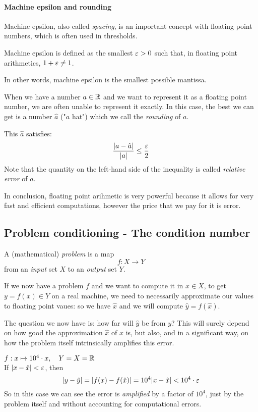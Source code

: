 \paragraph{Machine epsilon and rounding}
Machine epsilon, also called \emph{spacing}, is an important concept with floating point numbers, which is often used in thresholds.
\begin{Def}
	Machine epsilon is defined as the smallest $\varepsilon > 0$ such that, in floating point arithmetics, $1 + \varepsilon \neq 1$.
\end{Def}
In other words, machine epsilon is the smallest possible mantissa.

When we have a number $a \in \mathbb{R}$ and we want to represent it as a floating point number, we are often unable to represent it exactly. In this case, the best we can get is a number $\hat{a}$ ("$a$ hat") which we call the \emph{rounding} of $a$.

This $\hat{a}$ satisfies:
\begin{equation*}
	\frac{|a - \hat{a}|}{|a|} \leq \frac{\varepsilon}{2}
\end{equation*}
Note that the quantity on the left-hand side of the inequality is called \emph{relative error} of $a$.

In conclusion, floating point arihmetic is very powerful because it allows for very fast and efficient computations, however the price that we pay for it is error.

\subsection[Problem conditioning]{Problem conditioning - The condition number}
\begin{Def}[Problem]
	A (mathematical) \emph{problem} is a map
	\begin{equation*}
		{f : X \rightarrow Y}
	\end{equation*}
	from an \emph{input} set $X$ to an \emph{output} set $Y$.
\end{Def}

If we now have a problem $f$ and we want to compute it in $x \in X$, to get $y = f(x) \in Y$ on a real machine, we need to necessarily approximate our values to floating point vaues: so we have $\hat{x}$ and we will compute $\hat{y} = f(\hat{x})$.

The question we now have is: how far will $\hat{y}$ be from $y$? This will surely depend on how good the approximation $\hat{x}$ of $x$ is, but also, and in a significant way, on how the problem itself intrinsically amplifies this error.
\begin{Ex}
	$f : x \mapsto 10^4 \cdot x,\quad Y = X = \mathbb{R}$\\
	If $|x - \hat{x}| < \varepsilon$, then
	\begin{dmath*}
		|y - \hat{y}| = |f(x) - f(\hat{x})| = 10^4 |x - \hat{x}| < 10^4 \cdot \eps
	\end{dmath*}
	So in this case we can see the error is \emph{amplified} by a factor of $10^4$, just by the problem itself and without accounting for computational errors.
\end{Ex}

